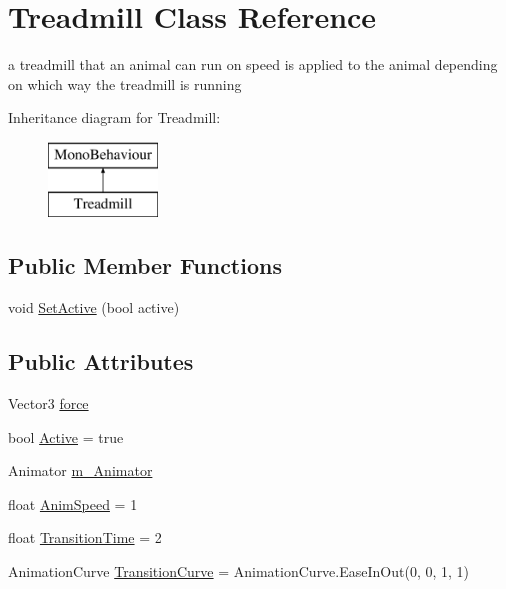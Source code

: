 \hypertarget{class_treadmill}{}\section{Treadmill Class Reference}
\label{class_treadmill}


a treadmill that an animal can run on speed is applied to the animal depending on which way the treadmill is running  


Inheritance diagram for Treadmill\+:\begin{figure}[H]
\begin{center}
\leavevmode
\includegraphics[height=2.000000cm]{class_treadmill}
\end{center}
\end{figure}
\subsection*{Public Member Functions}
\begin{DoxyCompactItemize}
\item 
void \mbox{\hyperlink{class_treadmill_a29882cad109f641453b5fea1e763fc13}{Set\+Active}} (bool active)
\end{DoxyCompactItemize}
\subsection*{Public Attributes}
\begin{DoxyCompactItemize}
\item 
Vector3 \mbox{\hyperlink{class_treadmill_ad1f6f91c2b11468633c46dffc69df3ec}{force}}
\item 
bool \mbox{\hyperlink{class_treadmill_ae03f9a4ffbfcbf5f664bda992fb56309}{Active}} = true
\item 
Animator \mbox{\hyperlink{class_treadmill_a944a58130156daeb07358a4545838e08}{m\+\_\+\+Animator}}
\item 
float \mbox{\hyperlink{class_treadmill_afa5dca4e017923fd60ece76e0cb7f9af}{Anim\+Speed}} = 1
\item 
float \mbox{\hyperlink{class_treadmill_a53d31f1368cf547ff9a4ee4c8650484e}{Transition\+Time}} = 2
\item 
Animation\+Curve \mbox{\hyperlink{class_treadmill_aa5870c200080e8bf45c917fe498c8b1a}{Transition\+Curve}} = Animation\+Curve.\+Ease\+In\+Out(0, 0, 1, 1)
\end{DoxyCompactItemize}


